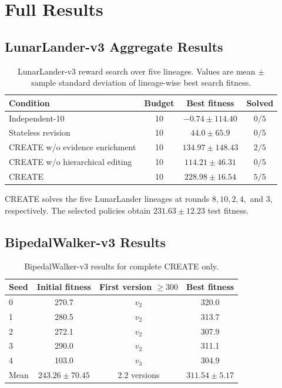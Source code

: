\documentclass[10pt]{article}
\begin{document}
\section{Full Results}

\subsection{LunarLander-v3 Aggregate Results}
\begin{table}[H]
\centering
\caption{LunarLander-v3 reward search over five lineages. Values are mean $\pm$ sample standard deviation of lineage-wise best search fitness.}
\label{tab:lander}
\begin{tabular}{lccc}
\toprule
Condition & Budget & Best fitness & Solved \\
\midrule
Independent-10 & 10 & $-0.74\pm114.40$ & $0/5$ \\
Stateless revision & 10 & $44.0\pm65.9$ & $0/5$ \\
CREATE w/o evidence enrichment & 10 & $134.97\pm148.43$ & $2/5$ \\
CREATE w/o hierarchical editing & 10 & $114.21\pm46.31$ & $0/5$ \\
CREATE & 10 & $228.98\pm16.54$ & $5/5$ \\
\bottomrule
\end{tabular}
\end{table}

CREATE solves the five LunarLander lineages at rounds $8,10,2,4,$ and $3$, respectively. The selected policies obtain $231.63\pm12.23$ test fitness.

\subsection{BipedalWalker-v3 Results}
\begin{table}[H]
\centering
\caption{BipedalWalker-v3 results for complete CREATE only.}
\label{tab:bipedal}
\begin{tabular}{lccc}
\toprule
Seed & Initial fitness & First version $\geq300$ & Best fitness \\
\midrule
0 & 270.7 & $v_2$ & 320.0 \\
1 & 280.5 & $v_2$ & 313.7 \\
2 & 272.1 & $v_2$ & 307.9 \\
3 & 290.0 & $v_2$ & 311.1 \\
4 & 103.0 & $v_3$ & 304.9 \\
\midrule
Mean & $243.26\pm70.45$ & 2.2 versions & $311.54\pm5.17$ \\
\bottomrule
\end{tabular}
\end{table}
\end{document}
